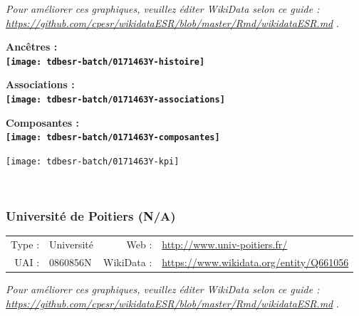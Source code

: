 \documentclass[12pt,french,]{article}
\begin{document}
\textit{\scriptsize Pour améliorer ces graphiques, veuillez éditer WikiData selon ce guide :  \href{https://github.com/cpesr/wikidataESR/blob/master/Rmd/wikidataESR.md}{https://github.com/cpesr/wikidataESR/blob/master/Rmd/wikidataESR.md}}
.

\vspace{1cm}  
\begin{minipage}[b]{0.50\textwidth}\begin{center} \bf Ancêtres : \\  
\texttt{[image: tdbesr-batch/0171463Y-histoire]} \end{center}\end{minipage}\begin{minipage}[b]{0.50\textwidth}\begin{center} \bf Associations : \\  
\texttt{[image: tdbesr-batch/0171463Y-associations]} \end{center}\end{minipage}

\hrulefill

\begin{center} \bf Composantes : \\  
\texttt{[image: tdbesr-batch/0171463Y-composantes]} \end{center}

\begin{center}\texttt{[image: tdbesr-batch/0171463Y-kpi]} \end{center}\checkoddpage

\ifoddpage \fi ~\newpage  

\hypertarget{universituxe9-de-poitiers-na}{%
\subsubsection{Université de Poitiers
(N/A)}\label{universituxe9-de-poitiers-na}}

\begin{tabular*}{\textwidth}{rp{5cm}rl}  
\hline  
Type : & Université & Web : &\href{http://www.univ-poitiers.fr/}{http://www.univ-poitiers.fr/} \\  
UAI : & 0860856N & WikiData : & \href{https://www.wikidata.org/entity/Q661056}{https://www.wikidata.org/entity/Q661056} \\  
\hline  
\end{tabular*}

\textit{\scriptsize Pour améliorer ces graphiques, veuillez éditer WikiData selon ce guide :  \href{https://github.com/cpesr/wikidataESR/blob/master/Rmd/wikidataESR.md}{https://github.com/cpesr/wikidataESR/blob/master/Rmd/wikidataESR.md}}
.
\end{document}
